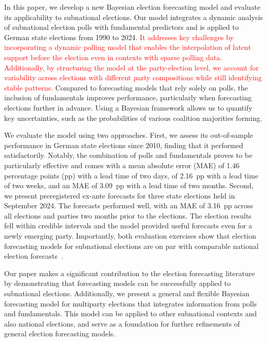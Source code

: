 \documentclass[doublespaced,12pt]{article}
\begin{document}
\begin{doublespacing}
In this paper, we develop a new Bayesian election forecasting model and evaluate its applicability to subnational elections. Our model integrates a dynamic analysis of subnational election polls with fundamental predictors and is applied to German state elections from 1990 to 2024. \textcolor{red}{It addresses key challenges by incorporating a dynamic polling model that enables the interpolation of latent support before the election even in contexts with sparse polling data. Additionally, by structuring the model at the party-election level, we account for variability across elections with different party compositions while still identifying stable patterns.} Compared to forecasting models that rely solely on polls, the inclusion of fundamentals improves performance, particularly when forecasting elections further in advance. Using a Bayesian framework allows us to quantify key uncertainties, such as the probabilities of various coalition majorities forming.

We evaluate the model using two approaches. First, we assess its out-of-sample performance in German state elections since 2010, finding that it performed satisfactorily. Notably, the combination of polls and fundamentals proves to be particularly effective and comes with a mean absolute error (MAE) of 1.46 percentage points (pp) with a lead time of two days, of 2.16~pp with a lead time of two weeks, and an MAE of 3.09~pp with a lead time of two months.  Second, we present preregistered ex-ante forecasts for three state elections held in September 2024. The forecasts performed well, with an MAE of 3.16~pp across all elections and parties two months prior to the elections. The election results fell within credible intervals and the model provided useful forecasts even for a newly emerging party. Importantly, both evaluation exercises show that election forecasting models for subnational elections are on par with comparable national election forecasts~\citep{jennings2018election,shirani2018disentangling,munzert_2017}.

Our paper makes a significant contribution to the election forecasting literature by demonstrating that forecasting models can be successfully applied to subnational elections. Additionally, we present a general and flexible Bayesian forecasting model for multiparty elections that integrates information from polls and fundamentals. This model can be applied to other subnational contexts and also national elections, and serve as a foundation for further refinements of general election forecasting models.


\end{doublespacing}
\end{document}
